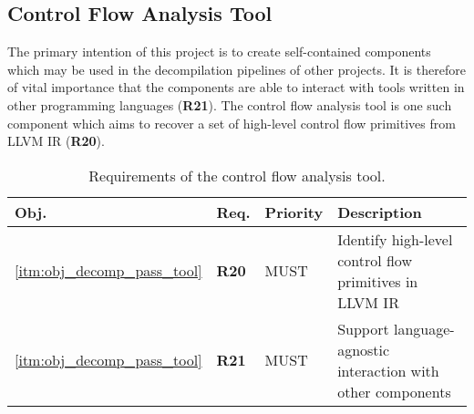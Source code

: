
\subsection{Control Flow Analysis Tool}
\label{sec:req_control_flow_analysis_tool}

The primary intention of this project is to create self-contained components which may be used in the decompilation pipelines of other projects. It is therefore of vital importance that the components are able to interact with tools written in other programming languages (\textbf{R21}). The control flow analysis tool is one such component which aims to recover a set of high-level control flow primitives from LLVM IR (\textbf{R20}).

\begin{table}[htbp]
	\begin{center}
		\begin{tabular}{|l|l|l|l|}
			\hline
			Obj. & Req. & Priority & Description \\
			\hline
			\ref{itm:obj_decomp_pass_tool} & \textbf{R20} & MUST & Identify high-level control flow primitives in LLVM IR \\
			\ref{itm:obj_decomp_pass_tool} & \textbf{R21} & MUST & Support language-agnostic interaction with other components \\
			\hline
		\end{tabular}
	\end{center}
	\caption{Requirements of the control flow analysis tool.}
\end{table}
